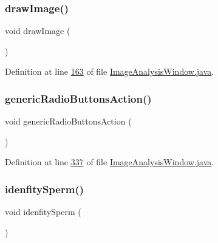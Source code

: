 \subsubsection{\texorpdfstring{draw\+Image()}{drawImage()}}
{\footnotesize\ttfamily void draw\+Image (\begin{DoxyParamCaption}{ }\end{DoxyParamCaption})\hspace{0.3cm}{\ttfamily [protected]}}



Definition at line \hyperlink{_image_analysis_window_8java_source_l00163}{163} of file \hyperlink{_image_analysis_window_8java_source}{Image\+Analysis\+Window.\+java}.

\hypertarget{classgui_1_1_image_analysis_window_ac6d8295d31ef4fe8406770e84eb35bf6}{}\label{classgui_1_1_image_analysis_window_ac6d8295d31ef4fe8406770e84eb35bf6} 
\subsubsection{\texorpdfstring{generic\+Radio\+Buttons\+Action()}{genericRadioButtonsAction()}}
{\footnotesize\ttfamily void generic\+Radio\+Buttons\+Action (\begin{DoxyParamCaption}{ }\end{DoxyParamCaption})\hspace{0.3cm}{\ttfamily [protected]}}



Definition at line \hyperlink{_image_analysis_window_8java_source_l00337}{337} of file \hyperlink{_image_analysis_window_8java_source}{Image\+Analysis\+Window.\+java}.

\hypertarget{classgui_1_1_image_analysis_window_ad0b8b85815ec344419394b160098d9a7}{}\label{classgui_1_1_image_analysis_window_ad0b8b85815ec344419394b160098d9a7} 
\subsubsection{\texorpdfstring{idenfity\+Sperm()}{idenfitySperm()}}
{\footnotesize\ttfamily void idenfity\+Sperm (\begin{DoxyParamCaption}{ }\end{DoxyParamCaption})}

